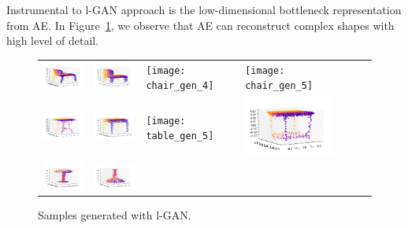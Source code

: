 \documentclass[12pt]{article}
\begin{document}
    Instrumental to l-GAN approach is the low-dimensional bottleneck representation from AE. In Figure~\ref{figure:samples_generated_with_latent_gan}, we observe that AE can reconstruct complex shapes with high level of detail.

    \begin{figure}
        \centering
        \begin{tabular}{lllllll}
            \includegraphics[width = 30mm]{chair_latent_gen_1} &
            \includegraphics[width = 30mm]{chair_latent_gen_2} &
            \texttt{[image: chair\_gen\_4]} &
            \texttt{[image: chair\_gen\_5]} \\
            \includegraphics[width = 30mm]{table_latent_gen_1} &
            \includegraphics[width = 30mm]{table_latent_gen_2} &
            \texttt{[image: table\_gen\_5]} &
            \includegraphics[width = 30mm]{table_latent_gen_4} \\
            \includegraphics[width = 30mm]{lamp_latent_gen_1} &
            \includegraphics[width = 30mm]{lamp_latent_gen_2} \\

        \end{tabular}
        \caption{Samples generated with l-GAN.}
        \label{figure:samples_generated_with_latent_gan}
    \end{figure}
\end{document}
